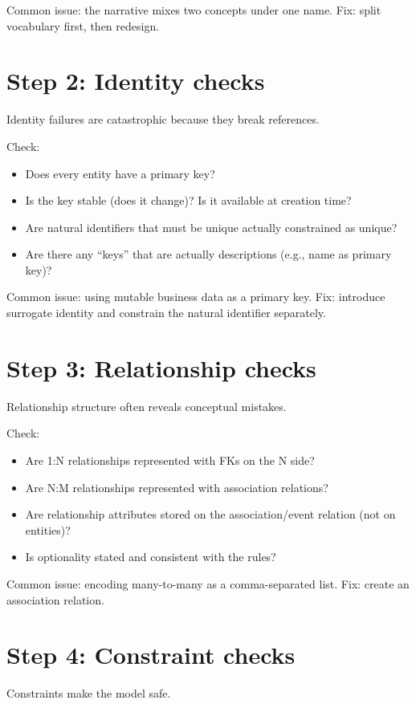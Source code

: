 Common issue: the narrative mixes two concepts under one name.
Fix: split vocabulary first, then redesign.

\section{Step 2: Identity checks}
Identity failures are catastrophic because they break references.

Check:
\begin{itemize}[leftmargin=*,nosep]
  \item Does every entity have a primary key?
  \item Is the key stable (does it change)? Is it available at creation time?
  \item Are natural identifiers that must be unique actually constrained as unique?
  \item Are there any “keys” that are actually descriptions (e.g., name as primary key)?
\end{itemize}

Common issue: using mutable business data as a primary key.
Fix: introduce surrogate identity and constrain the natural identifier separately.

\section{Step 3: Relationship checks}
Relationship structure often reveals conceptual mistakes.

Check:
\begin{itemize}[leftmargin=*,nosep]
  \item Are 1:N relationships represented with FKs on the N side?
  \item Are N:M relationships represented with association relations?
  \item Are relationship attributes stored on the association/event relation (not on entities)?
  \item Is optionality stated and consistent with the rules?
\end{itemize}

Common issue: encoding many-to-many as a comma-separated list.
Fix: create an association relation.

\section{Step 4: Constraint checks}
Constraints make the model safe.

